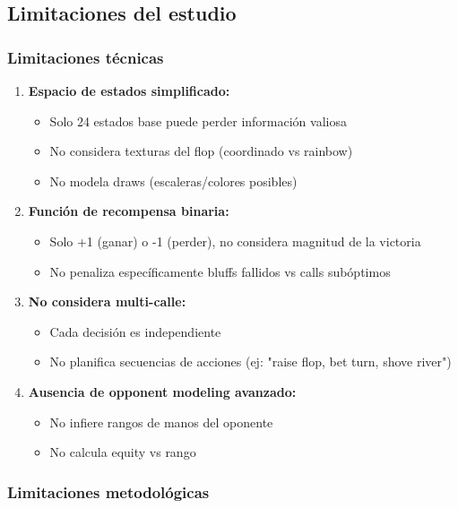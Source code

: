 \documentclass[12pt,a4paper]{article}
\begin{document}
\subsection{Limitaciones del estudio}

\subsubsection{Limitaciones técnicas}

\begin{enumerate}
    \item \textbf{Espacio de estados simplificado:}
    \begin{itemize}
        \item Solo 24 estados base puede perder información valiosa
        \item No considera texturas del flop (coordinado vs rainbow)
        \item No modela draws (escaleras/colores posibles)
    \end{itemize}
    
    \item \textbf{Función de recompensa binaria:}
    \begin{itemize}
        \item Solo +1 (ganar) o -1 (perder), no considera magnitud de la victoria
        \item No penaliza específicamente bluffs fallidos vs calls subóptimos
    \end{itemize}
    
    \item \textbf{No considera multi-calle:}
    \begin{itemize}
        \item Cada decisión es independiente
        \item No planifica secuencias de acciones (ej: "raise flop, bet turn, shove river")
    \end{itemize}
    
    \item \textbf{Ausencia de opponent modeling avanzado:}
    \begin{itemize}
        \item No infiere rangos de manos del oponente
        \item No calcula equity vs rango
    \end{itemize}
\end{enumerate}

\subsubsection{Limitaciones metodológicas}
\end{document}
